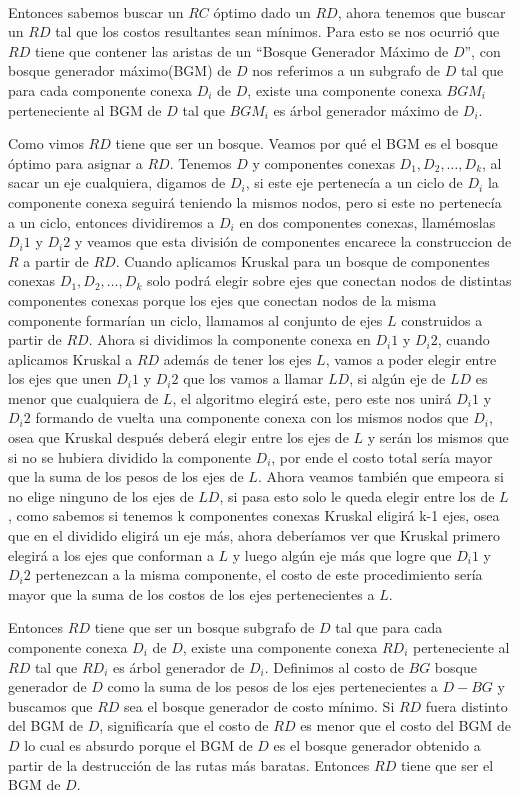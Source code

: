 \\
\par
Entonces sabemos buscar un $RC$ óptimo dado un $RD$, ahora tenemos que buscar un $RD$ tal que los costos resultantes sean mínimos. Para esto se nos ocurrió que $RD$ tiene que contener las aristas de un “Bosque Generador Máximo de $D$”, con bosque generador máximo(BGM) de $D$ nos referimos a un subgrafo de $D$ tal que para cada componente conexa $D_i$ de $D$, existe una componente conexa $BGM_i$ perteneciente al BGM de $D$ tal que $BGM_i$ es árbol generador máximo de $D_i$. 
\\
\par
Como vimos $RD$ tiene que ser un bosque. Veamos por qué el BGM es el bosque óptimo para asignar a $RD$. Tenemos $D$ y componentes conexas $D_1 , D_2 , … , D_k$, al sacar un eje cualquiera, digamos de $D_i$, si este eje pertenecía a un ciclo de $D_i$ la componente conexa seguirá teniendo la mismos nodos, pero si este no pertenecía a un ciclo, entonces dividiremos a $D_i$ en dos componentes conexas, llamémoslas $D_i1$ y $D_i2$ y veamos que esta división de componentes encarece la construccion de $R$ a partir de $RD$. Cuando aplicamos Kruskal para un bosque de componentes conexas $D_1 , D_2 , … , D_k$ solo podrá elegir sobre ejes que conectan nodos de distintas componentes conexas porque los ejes que conectan nodos de la misma componente formarían un ciclo, llamamos al conjunto de ejes $L$ construidos a partir de $RD$. Ahora si dividimos la componente conexa en $D_i1$ y $D_i2$, cuando aplicamos Kruskal a $RD$ además de tener los ejes $L$, vamos a poder elegir entre los ejes que unen $D_i1$ y $D_i2$ que los vamos a llamar $LD$, si algún eje de $LD$ es menor que cualquiera de $L$, el algoritmo elegirá este, pero este nos unirá  $D_i1$ y $D_i2$ formando de vuelta una componente conexa con los mismos nodos que $D_i$, osea que Kruskal después deberá elegir entre los ejes de $L$ y serán los mismos que si no se hubiera dividido la componente $D_i$, por ende el costo total sería mayor que la suma de los pesos de los ejes de $L$. Ahora veamos también que empeora si no elige ninguno de los ejes de $LD$, si pasa esto solo le queda elegir entre los de $L$, como sabemos si tenemos k componentes conexas Kruskal eligirá k-1 ejes, osea que en el dividido eligirá un eje más, ahora deberíamos ver que Kruskal primero elegirá a los ejes que conforman a $L$ y luego algún eje más que logre que $D_i1$ y $D_i2$ pertenezcan a la misma componente, el costo de este procedimiento sería mayor que la suma de los costos de los ejes pertenecientes a $L$.
\\
\par
Entonces $RD$ tiene que ser un bosque subgrafo de $D$ tal que para cada componente conexa $D_i$ de $D$, existe una componente conexa $RD_i$ perteneciente al $RD$ tal que $RD_i$ es árbol generador de $D_i$. Definimos al costo de $BG$ bosque generador de $D$  como la suma de los pesos de los ejes pertenecientes a $D - BG$ y buscamos que $RD$ sea el bosque generador de costo mínimo. Si $RD$ fuera distinto del BGM de $D$, significaría que el costo de $RD$ es menor que el costo del BGM de $D$ lo cual es absurdo porque el BGM de $D$ es el bosque generador obtenido a partir de la destrucción de las rutas más baratas. Entonces $RD$ tiene que ser el BGM de $D$.

